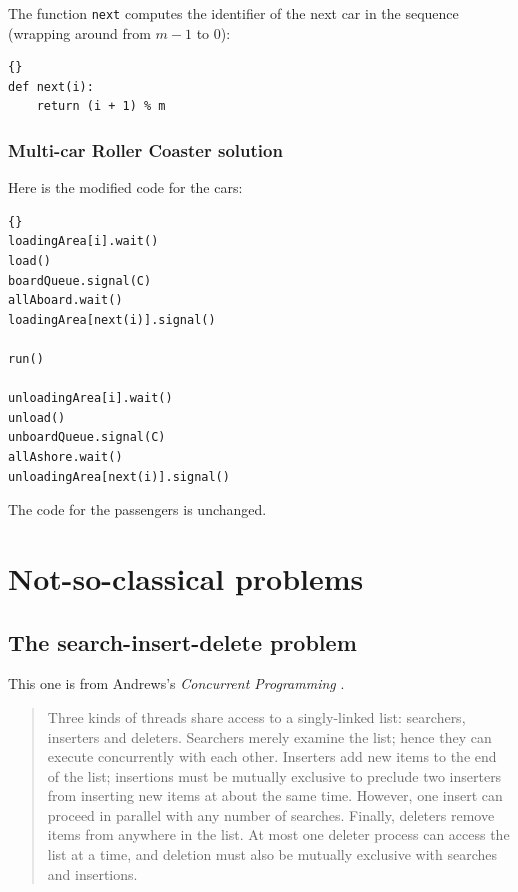 \documentclass{book}
\newcommand{\clearemptydoublepage}{\newpage\cleardoublepage}
\begin{document}
The function {\tt next} computes the identifier of the next
car in the sequence (wrapping around from $m-1$ to 0):

\begin{latin}
\begin{latin}
\begin{lstlisting}[title={Implementation of {\tt next}}]{}
def next(i):
    return (i + 1) % m
\end{lstlisting}
\end{latin}
\end{latin}



\clearemptydoublepage
\subsection{Multi-car Roller Coaster solution}

Here is the modified code for the cars:

\begin{latin}
\begin{latin}
\begin{lstlisting}[title={Multi-car Roller Coaster solution (car)}]{}
loadingArea[i].wait()
load()
boardQueue.signal(C)
allAboard.wait()
loadingArea[next(i)].signal()

run()

unloadingArea[i].wait()
unload()
unboardQueue.signal(C)
allAshore.wait()
unloadingArea[next(i)].signal()
\end{lstlisting}
\end{latin}
\end{latin}

The code for the passengers is unchanged.


\clearemptydoublepage
\chapter{Not-so-classical problems}

\section{The search-insert-delete problem}

This one is from Andrews's {\em Concurrent Programming} \cite{andrews}.

\begin {quotation}
Three kinds of threads share access to a singly-linked list:
searchers, inserters and deleters.  Searchers merely examine the list;
hence they can execute concurrently with each other.  Inserters add
new items to the end of the list; insertions must be mutually
exclusive to preclude two inserters from inserting new items at about
the same time.  However, one insert can proceed in parallel with any
number of searches.  Finally, deleters remove items from anywhere in
the list.  At most one deleter process can access the list at a time,
and deletion must also be mutually exclusive with searches and
insertions.
\end{quotation}
\end{document}
